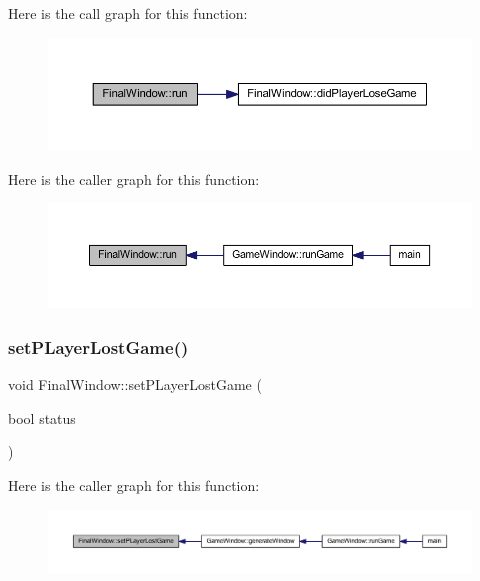 Here is the call graph for this function\+:\nopagebreak
\begin{figure}[H]
\begin{center}
\leavevmode
\includegraphics[width=350pt]{class_final_window_ad0ff2789d7ab310a4b70e393f602deff_cgraph}
\end{center}
\end{figure}
Here is the caller graph for this function\+:\nopagebreak
\begin{figure}[H]
\begin{center}
\leavevmode
\includegraphics[width=350pt]{class_final_window_ad0ff2789d7ab310a4b70e393f602deff_icgraph}
\end{center}
\end{figure}
\mbox{\label{class_final_window_a3ad8ebeede5375c9cd4732e794f076ac}} 
\subsubsection{\texorpdfstring{set\+P\+Layer\+Lost\+Game()}{setPLayerLostGame()}}
{\footnotesize\ttfamily void Final\+Window\+::set\+P\+Layer\+Lost\+Game (\begin{DoxyParamCaption}\item[{bool}]{status }\end{DoxyParamCaption})}

Here is the caller graph for this function\+:\nopagebreak
\begin{figure}[H]
\begin{center}
\leavevmode
\includegraphics[width=350pt]{class_final_window_a3ad8ebeede5375c9cd4732e794f076ac_icgraph}
\end{center}
\end{figure}
\mbox{\label{class_final_window_afd73d524fd2f10486d86a2e0057fcb54}} 
